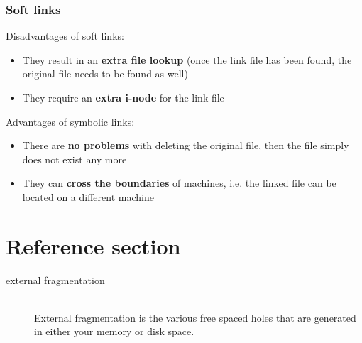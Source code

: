 \documentclass{article}
\begin{document}
\subsubsection{Soft links}
\begin{flushleft}
Disadvantages of soft links:
\begin{itemize}
	\item They result in an \textbf{extra file lookup} (once the link file has been found, the original file needs to be found as well)
	\item They require an \textbf{extra i-node} for the link file
\end{itemize}
Advantages of symbolic links:
\begin{itemize}
	\item There are \textbf{no problems} with deleting the original file, then the file simply does not exist any more
	\item They can \textbf{cross the boundaries} of machines, i.e. the linked file can be located on a different machine
\end{itemize}
\end{flushleft}

\pagebreak
\section*{Reference section} \label{sec:reference}
\begin{description}
	\item[external fragmentation] \hfill \\ External fragmentation is the various free spaced holes that are generated in either your memory or disk space.
\end{description}
\end{document}
